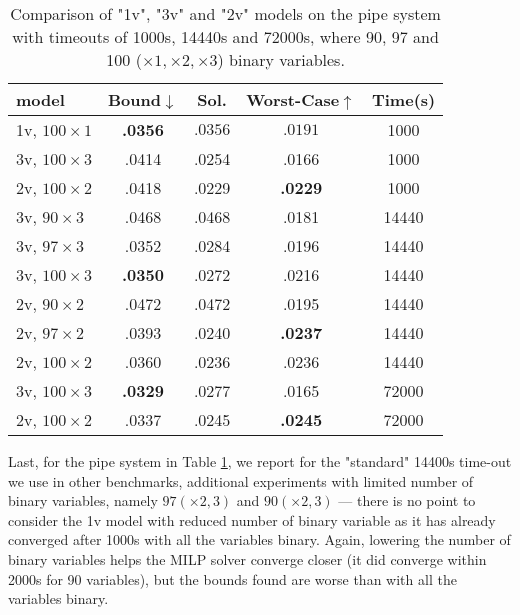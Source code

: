 	\begin{table}[b!]
	\begin{tabular}{||l||c|c|c|c||}\hline\hline
		model &        Bound$\downarrow$ &  Sol. &      Worst-Case$\uparrow$ &  Time(s) \\\hline \hline
		1v, $100 \times 1$ &     {\bf .0356} &  $.0356$ & $.0191$ &  1000 \\\hline
		3v, $100 \times 3$&     .0414 &  .0254 &  .0166 &  1000 \\\hline
		2v, $100 \times 2$&     .0418 &  .0229 &   {\bf .0229} &  1000 \\\hline \hline
		
	    3v, $90 \times 3$&     .0468 &  .0468 &  .0181 & 14440 \\\hline	
		3v, $97 \times 3$&     .0352 &  .0284 &  .0196 & 14440 \\\hline
		3v, $100 \times 3$&      {\bf .0350} &  .0272 &  .0216 & 14440 \\\hline

		2v, $90 \times 2$&     .0472 &  .0472 &  .0195 & 14440 \\\hline	
		2v, $97 \times 2$&     .0393 &  .0240 &   {\bf .0237} & 14440 \\\hline
		2v, $100 \times 2$&     .0360 &  .0236 &   .0236 & 14440 \\\hline \hline

		3v, $100 \times 3$&     {\bf .0329} &  .0277 &  .0165 & 72000 \\\hline
		2v, $100 \times 2$&     .0337 &  .0245 &  {\bf .0245} & 72000 \\\hline\hline
	\end{tabular}
	\caption{Comparison of "1v", "3v" and "2v" models on the pipe system with timeouts of 1000s, 14440s and 72000s, where 90, 97 and 100 ($\times 1, \times 2,\times 3$) binary variables.}
	\label{table.pipe}
\end{table}



Last, for the pipe system in Table \ref{table.pipe}, we report for the "standard" 14400s time-out we use in other benchmarks, additional experiments with limited number of binary variables, namely $97 (\times 2,3)$ and $90 (\times 2,3)$ --- there is no point to consider the 1v model with reduced number of binary variable as it has already converged after 1000s with all the variables binary. Again, lowering the number of binary variables helps the MILP solver converge closer (it did converge within 2000s for 90 variables), but the bounds found are worse than with all the variables binary.



